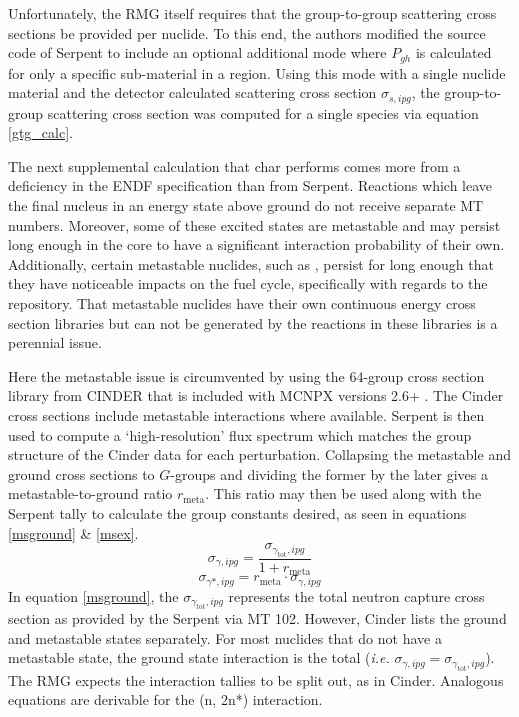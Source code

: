 Unfortunately, the RMG itself requires that the group-to-group scattering cross sections be provided 
per nuclide. To this end, the authors modified the source code of Serpent to include an optional 
additional mode where $P_{gh}$ is calculated for only a specific sub-material in a region.    
Using this mode with a single nuclide material and the detector calculated
scattering cross section $\sigma_{s,ipg}$, the group-to-group scattering cross section was computed 
for a single species via equation \ref{gtg_calc}.

The next supplemental calculation that char performs comes more from a deficiency in the 
ENDF specification than from Serpent.  Reactions which leave the final nucleus in an energy
state above ground do not receive separate MT numbers.  Moreover, some of these excited states
are metastable and may persist long enough in the core to have a significant interaction 
probability of their own.  Additionally, certain metastable nuclides, such as \superscript{*},
persist for long enough that they have noticeable impacts on the fuel cycle, specifically with regards to 
the repository.  That metastable nuclides have their own continuous energy cross section libraries
but can not be generated by the reactions in these libraries is a perennial issue.

Here the metastable issue is circumvented by using the 64-group cross section library from CINDER that is 
included with MCNPX versions 2.6+ \cite{Pelowitz2008}.  The Cinder cross sections include metastable
interactions where available.  Serpent is then used to compute a `high-resolution' 
flux spectrum which matches the group structure of the Cinder data for each perturbation.  
Collapsing the metastable and ground cross sections to $G$-groups and dividing the former by 
the later gives a metastable-to-ground ratio $r_{\mbox{meta}}$.  This ratio may then be used along with 
the Serpent tally to calculate the group constants desired, as seen in equations \ref{msground} \& 
\ref{msex}.
\begin{equation}
\label{msground}
\sigma_{\gamma,ipg} = \frac{\sigma_{\gamma_{\mbox{tot}},ipg}}{1 + r_{\mbox{meta}}}
\end{equation}
\begin{equation}
\label{msex}
\sigma_{\gamma*,ipg} = r_{\mbox{meta}} \cdot \sigma_{\gamma,ipg}
\end{equation}
In equation \ref{msground}, the $\sigma_{\gamma_{\mbox{tot}},ipg}$ represents the total neutron
capture cross section as provided by the Serpent via MT 102.  However, Cinder 
lists the ground and metastable states separately.  For most nuclides that do not have a metastable state, the 
ground state interaction is the total (\emph{i.e.} $\sigma_{\gamma,ipg} = \sigma_{\gamma_{\mbox{tot}},ipg}$).
The RMG expects the interaction tallies to be split out, as in Cinder.  Analogous equations are 
derivable for the (n, 2n*) interaction.

